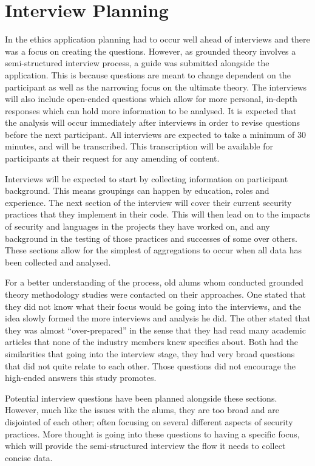 \section{Interview Planning}

\par In the ethics application planning had to occur well ahead of interviews and there was a focus on creating the questions. However, as grounded theory involves a semi-structured interview process, a guide was submitted alongside the application. This is because questions are meant to change dependent on the participant as well as the narrowing focus on the ultimate theory. The interviews will also include open-ended questions which allow for more personal, in-depth responses which can hold more information to be analysed. It is expected that the analysis will occur immediately after interviews in order to revise questions before the next participant.  All interviews are expected to take a minimum of 30 minutes, and will be transcribed. This transcription will be available for participants at their request for any amending of content.
\newline
\par Interviews will be expected to start by collecting information on participant background. This means groupings can happen by education, roles and experience. The next section of the interview will cover their current security practices that they implement in their code. This will then lead on to the impacts of security and languages in the projects they have worked on, and any background in the testing of those practices and successes of some over others. These sections allow for the simplest of aggregations to occur when all data has been collected and analysed. 
\newline
\par For a better understanding of the process, old alums whom conducted grounded theory methodology studies were contacted on their approaches. One stated that they did not know what their focus would be going into the interviews, and the idea slowly formed the more interviews and analysis he did. The other stated that they was almost “over-prepared” in the sense that they had read many academic articles that none of the industry members knew specifics about. Both had the similarities that going into the interview stage, they had very broad questions that did not quite relate to each other. Those questions did not encourage the high-ended answers this study promotes. 
\newline
\par Potential interview questions have been planned alongside these sections. However, much like the issues with the alums, they are too broad and are disjointed of each other; often focusing on several different aspects of security practices. More thought is going into these questions to having a specific focus, which will provide the semi-structured interview the flow it needs to collect concise data.



